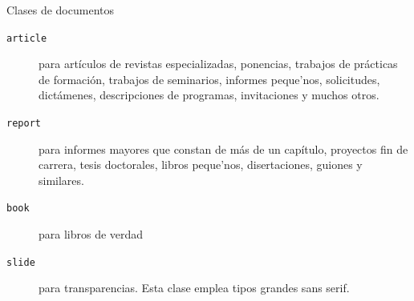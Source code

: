 \begin{table}[!bp]
\caption{Clases de documentos} \label{documentclasses}
\begin{description}

\item [\normalfont\texttt{article}] para art\'iculos de revistas
  especializadas, ponencias, trabajos de pr\'acticas de formaci\'on,
  trabajos de seminarios, informes peque'nos, solicitudes,
  dict\'amenes, descripciones de programas, invitaciones y muchos
  otros.%
\item [\normalfont\texttt{report}] para informes mayores que constan
  de m\'as de un cap\'itulo, proyectos fin de carrera, tesis doctorales,
  libros peque'nos, disertaciones, guiones y
  similares.
\item [\normalfont\texttt{book}] para libros de
  verdad
\item [\normalfont\texttt{slide}] para transparencias. Esta clase emplea
  tipos grandes \textsf{sans serif}.
\end{description}
\end{table}

